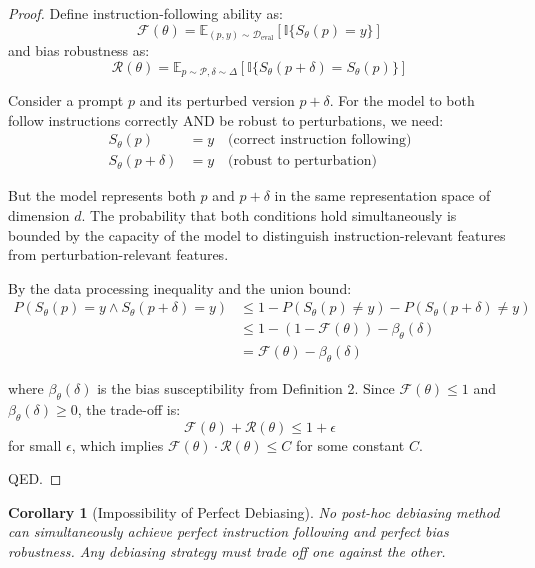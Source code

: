\documentclass[11pt]{article}
\newtheorem{corollary}{Corollary}
\begin{document}
\begin{proof}
Define instruction-following ability as:
\begin{equation}
\mathcal{F}(\theta) = \mathbb{E}_{(p, y) \sim \mathcal{D}_{\text{eval}}} [\mathbb{I}\{S_\theta(p) = y\}]
\end{equation}
and bias robustness as:
\begin{equation}
\mathcal{R}(\theta) = \mathbb{E}_{p \sim \mathcal{P}, \delta \sim \Delta} [\mathbb{I}\{S_\theta(p+\delta) = S_\theta(p)\}]
\end{equation}

Consider a prompt $p$ and its perturbed version $p+\delta$. For the model to both follow instructions correctly AND be robust to perturbations, we need:
\begin{align}
S_\theta(p) &= y \quad \text{(correct instruction following)} \\
S_\theta(p+\delta) &= y \quad \text{(robust to perturbation)}
\end{align}

But the model represents both $p$ and $p+\delta$ in the same representation space of dimension $d$. The probability that both conditions hold simultaneously is bounded by the capacity of the model to distinguish instruction-relevant features from perturbation-relevant features.

By the data processing inequality and the union bound:
\begin{align}
P(S_\theta(p)=y \wedge S_\theta(p+\delta)=y) &\leq 1 - P(S_\theta(p) \neq y) - P(S_\theta(p+\delta) \neq y) \\
&\leq 1 - (1-\mathcal{F}(\theta)) - \beta_\theta(\delta) \\
&= \mathcal{F}(\theta) - \beta_\theta(\delta)
\end{align}

where $\beta_\theta(\delta)$ is the bias susceptibility from Definition 2. Since $\mathcal{F}(\theta) \leq 1$ and $\beta_\theta(\delta) \geq 0$, the trade-off is:
\begin{equation}
\mathcal{F}(\theta) + \mathcal{R}(\theta) \leq 1 + \epsilon
\end{equation}
for small $\epsilon$, which implies $\mathcal{F}(\theta) \cdot \mathcal{R}(\theta) \leq C$ for some constant $C$.

QED.
\end{proof}

\begin{corollary}[Impossibility of Perfect Debiasing]
No post-hoc debiasing method can simultaneously achieve perfect instruction following and perfect bias robustness. Any debiasing strategy must trade off one against the other.
\end{corollary}
\end{document}
